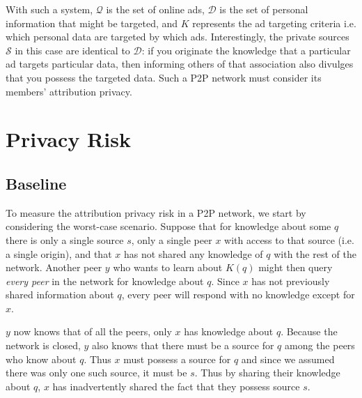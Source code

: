 \documentclass{article}
\begin{document}
With such a system, $\mathcal{Q}$ is the set of online ads, $\mathcal{D}$ is the
set of personal information that might be targeted, and $K$ represents the ad
targeting criteria i.e. which personal data are targeted by which ads.
Interestingly, the private sources $\mathcal{S}$ in this case are identical to
$\mathcal{D}$: if you originate the knowledge that a particular ad targets
particular data, then informing others of that association also divulges that
you possess the targeted data. Such a P2P network must consider its members'
attribution privacy.

\section{Privacy Risk}\label{sec:prrsk}
\subsection{Baseline}\label{sec:baseline}

To measure the attribution privacy risk in a P2P network, we start by
considering the worst-case scenario. Suppose that for knowledge about some $q$
there is only a single source $s$, only a single peer $x$ with access to that
source (i.e. a single origin), and that $x$ has not shared any knowledge of $q$
with the rest of the network. Another peer $y$ who wants to learn about $K(q)$
might then query {\it every peer} in the network for knowledge about $q$. Since
$x$ has not previously shared information about $q$, every peer will respond
with no knowledge except for $x$.

$y$ now knows that of all the peers, only $x$ has knowledge about $q$. Because
the network is closed, $y$ also knows that there must be a source for $q$ among
the peers who know about $q$. Thus $x$ must possess a source for $q$ and since
we assumed there was only one such source, it must be $s$. Thus by sharing their
knowledge about $q$, $x$ has inadvertently shared the fact that they possess
source $s$.
\end{document}
